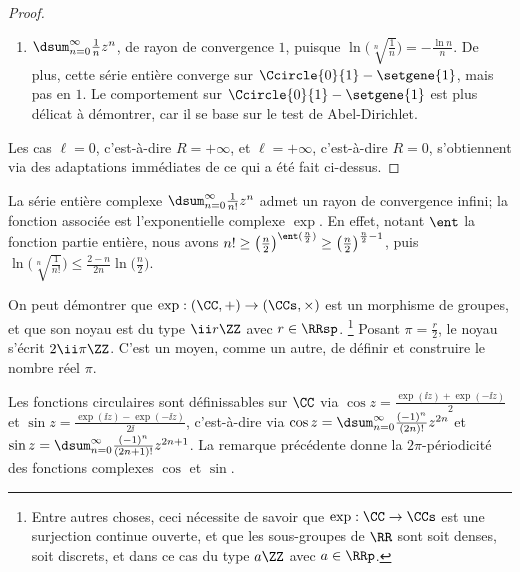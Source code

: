 \begin{proof}
\begin{itemize}
\begin{enumerate}[label=(\alph*)]
	        \item $\dsum_{n=0}^{\infty}  \frac{1}{n} z^n$, 
	        de rayon de convergence $1$,
	        puisque 
	        $ \ln \big( \sqrt[n]{\frac{1}{n}} \big)
	        = -\frac{\ln n}{n}$.
	        De plus,
	        cette série entière converge sur $\Ccircle{0}{1} - \setgene{1}$, mais pas en $1$. 
	        Le comportement sur $\Ccircle{0}{1} - \setgene{1}$ est plus délicat à démontrer, car il se base sur le test de Abel-Dirichlet.
	    \end{enumerate}
    \end{itemize}


    Les cas
    $\ell = 0$, c'est-à-dire $R = +\infty$,
    et
    $\ell = +\infty$, c'est-à-dire $R = 0$,
    s'obtiennent via des adaptations immédiates de ce qui a été fait ci-dessus.
\end{proof}


\begin{example}
	La série entière complexe $\dsum_{n=0}^{\infty} \frac{1}{n!} z^n$ admet un rayon de convergence infini; la fonction associée est l'exponentielle complexe $\exp$.
	En effet,
	notant $\ent$ la fonction partie entière, nous avons
	$n! \geq \big( \frac{n}{2} \big)^{\ent (\frac{n}{2})} \geq \big( \frac{n}{2} \big)^{\frac{n}{2} - 1}$,
	puis
	$ \ln \big( \sqrt[n]{\frac{1}{n!}} \big)
	\leq
	  \frac{2 - n}{2 n} \ln \big( \frac{n}{2} \big)$.
\end{example}


\begin{remark}
	On peut démontrer que
	$\exp : (\CC , {+}) \to (\CCs, {\times})$ est un morphisme de groupes, et que son noyau est du type $\ii r \ZZ$ avec $r \in \RRsp$.%
	\footnote{
	    Entre autres choses, ceci nécessite de savoir que
	    $\exp: \CC \to \CCs$ est une surjection continue ouverte,
	    et
	    que les sous-groupes de $\RR$ sont soit denses, soit discrets, et dans ce cas du type $a \ZZ$ avec $a \in \RRp$. 
	}
	Posant $\pi = \frac{r}{2}$, le noyau s'écrit $2 \ii \pi \ZZ$.
	C'est un moyen, comme un autre, de définir et construire le nombre réel $\pi$.
\end{remark}


\begin{example} \label{cos-sin-analytic}
    Les fonctions circulaires sont définissables sur $\CC$ via
    $\cos z = \frac{\exp(\ii z) + \exp(- \ii z)}{2}$
    et
    $\sin z = \frac{\exp(\ii z) - \exp(- \ii z)}{2 \ii}$,
    c'est-à-dire via
    $\cos z = \dsum_{n=0}^{\infty} \frac{(-1)^n}{(2n)!} z^{2n}$
    et
    $\sin z = \dsum_{n=0}^{\infty} \frac{(-1)^n}{(2n+ 1)!} z^{2n+1}$.
    La remarque précédente donne la $2 \pi$-périodicité des fonctions complexes $\cos$ et $\sin$.
\end{example}


